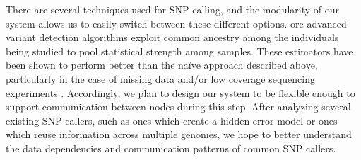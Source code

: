 \documentclass[10pt]{article}
\begin{document}
%

There are several techniques used for SNP calling,
and the modularity of our system allows us to easily switch between these
different options.  ore advanced variant detection algorithms exploit common
ancestry among the individuals being studied to pool statistical strength among
samples.  These estimators have been shown to perform better than the na\"{i}ve
approach described above, particularly in the case of missing data and/or low
coverage sequencing experiments \cite{nielsen}.  Accordingly, we plan to design
our system to be flexible enough to support communication between nodes during
this step.  After analyzing several existing SNP callers, such as ones which
create a hidden error model or ones which reuse information across multiple
genomes, we hope to better understand the data dependencies and communication
patterns of common SNP callers.  

\end{document}
